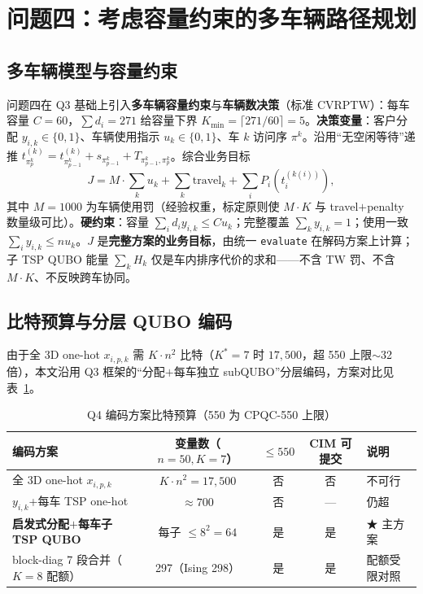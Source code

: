 \documentclass[UTF8,12pt,a4paper]{ctexart}
\begin{document}
\section{问题四：考虑容量约束的多车辆路径规划}
\label{sec:q4}

\subsection{多车辆模型与容量约束}
\label{subsec:q4-model}

问题四在 Q3 基础上引入\textbf{多车辆容量约束}与\textbf{车辆数决策}（标准 CVRPTW\cite{toth2014vrp,feld2019cvrp,salehi2022vrpqubo,harwood2021vrptwqubo}）：每车容量 $C=60$，$\sum d_i=271$ 给容量下界 $K_{\min}=\lceil 271/60\rceil=5$。\textbf{决策变量}：客户分配 $y_{i,k}\!\in\!\{0,1\}$、车辆使用指示 $u_k\!\in\!\{0,1\}$、车 $k$ 访问序 $\pi^k$。沿用``无空闲等待''递推 $t_{\pi_p^k}^{(k)}=t_{\pi_{p-1}^k}^{(k)}+s_{\pi_{p-1}^k}+T_{\pi_{p-1}^k,\pi_p^k}$。综合业务目标
\begin{equation}
\label{eq:q4-J}
J=M\!\cdot\!\sum_{k} u_k+\sum_{k}\mathrm{travel}_k+\sum_{i} P_i(t_i^{(k(i))}),
\end{equation}
其中 $M=1000$ 为车辆使用罚（经验权重，标定原则使 $M\!\cdot\!K$ 与 travel$+$penalty 数量级可比）。\textbf{硬约束}：容量 $\sum_i d_i y_{i,k}\le C u_k$；完整覆盖 $\sum_k y_{i,k}=1$；使用一致 $\sum_i y_{i,k}\le n u_k$。$J$ 是\textbf{完整方案的业务目标}，由统一 \texttt{evaluate} 在解码方案上计算；子 TSP QUBO 能量 $\sum_k H_k$ 仅是车内排序代价的求和——不含 TW 罚、不含 $M\!\cdot\!K$、不反映跨车协同。

\subsection{比特预算与分层 QUBO 编码}
\label{subsec:q4-budget}

由于全 3D one-hot $x_{i,p,k}$ 需 $K\!\cdot\!n^{2}$ 比特（$K^{*}=7$ 时 $17{,}500$，超 550 上限$\sim$32 倍），本文沿用 Q3 框架的``分配$+$每车独立 subQUBO''分层编码，方案对比见表~\ref{tab:q4-budget}。

\begin{table}[H]
    \centering\footnotesize
    \caption{Q4 编码方案比特预算（550 为 CPQC-550 上限）}
    \label{tab:q4-budget}
    \begin{tabular}{lcccl}
        \toprule
        编码方案 & 变量数（$n=50,K=7$）& $\le 550$ & CIM 可提交 & 说明 \\
        \midrule
        全 3D one-hot $x_{i,p,k}$ & $K\!\cdot\!n^{2}=17{,}500$ & 否 & 否 & 不可行 \\
        $y_{i,k}$+每车 TSP one-hot & $\approx 700$ & 否 & --- & 仍超 \\
        \textbf{启发式分配$+$每车子 TSP QUBO} & 每子 $\le 8^{2}=64$ & 是 & 是 & ★ 主方案 \\
        block-diag 7 段合并（$K=8$ 配额） & 297（Ising 298）& 是 & 是 & 配额受限对照 \\
        \bottomrule
    \end{tabular}
\end{table}
\end{document}
